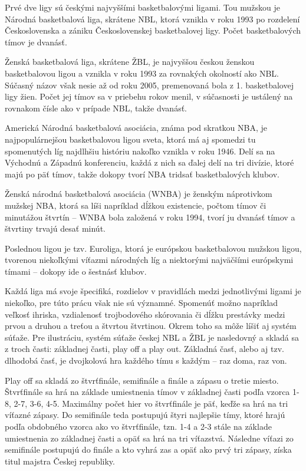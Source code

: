 \documentclass[
  digital, %
  oneside, %
  notable,   %
  lof,     %
  lot,     %
]{fithesis3}
\begin{document}
		Prvé dve ligy sú českými najvyššími basketbalovými ligami. Tou mužskou je Národná basketbalová liga, skrátene NBL, ktorá vznikla v roku 1993 po rozdelení Československa a zániku Československej basketbalovej ligy. Počet basketbalových tímov je dvanásť.
		
		Ženská basketbalová liga, skrátene ŽBL, je najvyššou českou ženskou basketbalovou ligou a 
		vznikla v roku 1993 za rovnakých okolností ako NBL. Súčasný názov však nesie až od roku 2005, premenovaná bola z 1. basketbalovej ligy žien. Počet jej tímov sa v priebehu rokov menil, v súčasnosti je ustálený na rovnakom čísle ako v prípade NBL, takže dvanásť.
		
		Americká Národná basketbalová asociácia, známa pod skratkou NBA, je najpopulárnejšou basketbalovou ligou sveta, ktorá má aj spomedzi tu spomenutých líg najdlhšiu históriu nakoľko vznikla v roku 1946. Delí sa na Východnú a Západnú konferenciu, každá z nich sa ďalej delí na tri divízie, ktoré majú po päť tímov, takže dokopy tvorí NBA tridsať basketbalových klubov.
		
		Ženská národná basketbalová asociácia (WNBA) je ženským náprotivkom mužskej NBA, ktorá sa líši napríklad dĺžkou existencie, počtom tímov či minutážou štvrtín – WNBA bola založená v roku 1994, tvorí ju dvanásť tímov a štvrtiny trvajú desať minút.
		
		Poslednou ligou je tzv. Euroliga, ktorá je európskou basketbalovou mužskou ligou, tvorenou niekoľkými víťazmi národných líg a  niektorými najväčšími európskymi tímami – dokopy ide o šestnásť klubov. 
		
		Každá liga má svoje špecifiká, rozdielov v pravidlách medzi jednotlivými ligami je niekoľko, pre túto prácu však nie sú významné. Spomenúť možno napríklad veľkosť ihriska, vzdialenosť trojbodového skórovania či dĺžku prestávky medzi prvou a druhou a treťou a štvrtou štvrtinou. Okrem toho sa môže líšiť aj systém súťaže. Pre ilustráciu, systém súťaže českej NBL a ŽBL je nasledovný a skladá sa z troch časti: základnej časti, play off a play out. Základná časť, alebo aj tzv. dlhodobá časť, je dvojkolová hra každého tímu s každým – raz doma, raz von. 
		
		Play off sa skladá zo štvrťfinále, semifinále a finále a zápasu o tretie miesto. Štvrťfinále sa hrá na základe umiestnenia tímov v základnej časti podľa vzorca 1-8, 2-7, 3-6, 4-5. Maximálny počet hier vo štvrťfinále je päť, keďže sa hrá na tri víťazné zápasy. Do semifinále teda postupujú štyri najlepšie tímy, ktoré hrajú podľa obdobného vzorca ako vo štvrťfinále, tzn. 1-4 a 2-3 stále na základe umiestnenia zo základnej časti a opäť sa hrá na tri víťazstvá. Následne víťazi zo semifinále postupujú do finále a kto vyhrá zas a opäť ako prvý tri zápasy, získa titul majstra Českej republiky.
		
\end{document}
